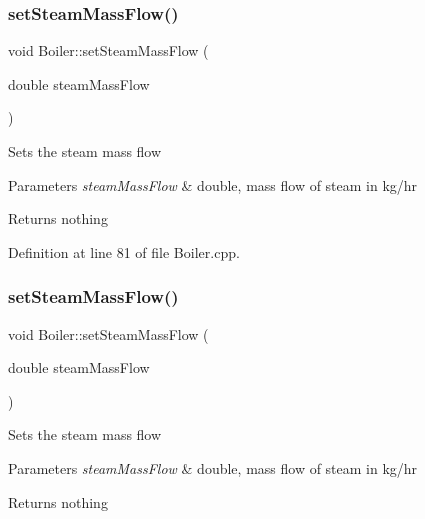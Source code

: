 \subsubsection{\texorpdfstring{set\+Steam\+Mass\+Flow()}{setSteamMassFlow()}\hspace{0.1cm}{\footnotesize\ttfamily [1/3]}}
{\footnotesize\ttfamily void Boiler\+::set\+Steam\+Mass\+Flow (\begin{DoxyParamCaption}\item[{double}]{steam\+Mass\+Flow }\end{DoxyParamCaption})}

Sets the steam mass flow 
\begin{DoxyParams}{Parameters}
{\em steam\+Mass\+Flow} & double, mass flow of steam in kg/hr \\
\hline
\end{DoxyParams}
\begin{DoxyReturn}{Returns}
nothing 
\end{DoxyReturn}


Definition at line 81 of file Boiler.\+cpp.

\mbox{\label{class_boiler_ada7af5896a2a4701d78a532dc9bc9892}} 
\subsubsection{\texorpdfstring{set\+Steam\+Mass\+Flow()}{setSteamMassFlow()}\hspace{0.1cm}{\footnotesize\ttfamily [2/3]}}
{\footnotesize\ttfamily void Boiler\+::set\+Steam\+Mass\+Flow (\begin{DoxyParamCaption}\item[{double}]{steam\+Mass\+Flow }\end{DoxyParamCaption})}

Sets the steam mass flow 
\begin{DoxyParams}{Parameters}
{\em steam\+Mass\+Flow} & double, mass flow of steam in kg/hr \\
\hline
\end{DoxyParams}
\begin{DoxyReturn}{Returns}
nothing 
\end{DoxyReturn}
\mbox{\label{class_boiler_ada7af5896a2a4701d78a532dc9bc9892}} 
